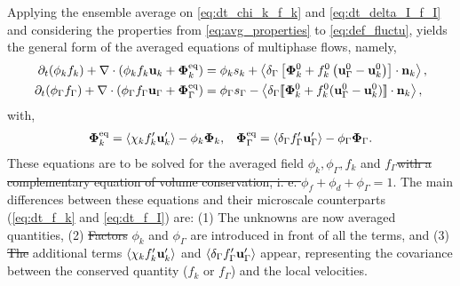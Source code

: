 \documentclass[11pt]{My_preprint}
\providecommand{\DIFadd}[1]{{\protect\color{blue}\uwave{#1}}} %
\providecommand{\DIFdel}[1]{{\protect\color{red}\sout{#1}}}                      %
\providecommand{\DIFaddbegin}{} %
\providecommand{\DIFaddend}{} %
\providecommand{\DIFdelbegin}{} %
\providecommand{\DIFdelend}{} %
\begin{document}
Applying the ensemble average on \ref{eq:dt_chi_k_f_k} and \ref{eq:dt_delta_I_f_I} and considering the properties from \ref{eq:avg_properties} to \ref{eq:def_fluctu}, yields the general form of the averaged equations of multiphase flows, namely,
\begin{align}
    \pddt (\phi_k f_k)
    +\div (\phi_k f_k \textbf{u}_k + \mathbf{\Phi}_k^\text{eq})
    &= 
    \phi_k s_k
    + \avg{\delta_\Gamma\left[
        \mathbf{\Phi}_k^0
        + f_k^0
        \left(
            \textbf{u}_\Gamma^0
            - \textbf{u}_k^0
        \right)
    \right]
    \cdot \textbf{n}_k},
    \label{eq:avg_dt_chi_f}\\
    \pddt (\phi_\Gamma f_\Gamma)
    +\div (\phi_\Gamma f_\Gamma \textbf{u}_\Gamma+ \mathbf{\Phi}_\Gamma^\text{eq})
    &= 
    \phi_\Gamma s_\Gamma
    - \avg{\delta_\Gamma 
    \Jump{
    \mathbf{\Phi}_k^0
    + f_k^0 (\textbf{u}_\Gamma^0 - \textbf{u}_k^0)
    } 
     },
    \label{eq:avg_dt_delta_f}
\end{align}
with, 
\begin{align}
    \mathbf{\Phi}_k^\text{eq}
    = \left<\chi_k f_k' \textbf{u}_k'\right>
    - \phi_k \bm\Phi_k,
    &&
    \mathbf{\Phi}_\Gamma^\text{eq}
    = \left<\delta_\Gamma f_\Gamma' \textbf{u}_\Gamma'\right>
    - \phi_\Gamma \bm\Phi_\Gamma. 
\end{align}
These equations are to be solved for the averaged field \DIFdelbegin \DIFdel{$\phi_k,\phi_\Gamma,f_k$ }\DIFdelend \DIFaddbegin \DIFadd{$f_f,f_d$, }\DIFaddend and $f_\Gamma$\DIFdelbegin \DIFdel{with a complementary equation of volume conservation, i.
e. $\phi_f+\phi_d+\phi_\Gamma = 1$}\DIFdelend .
The main differences between these equations and their microscale counterparts (\ref{eq:dt_f_k} and \ref{eq:dt_f_I}) are:
(1) The unknowns are now averaged quantities,
(2) \DIFdelbegin \DIFdel{Factors }\DIFdelend \DIFaddbegin \DIFadd{factors }\DIFaddend $\phi_k$ and $\phi_\Gamma$ are introduced in front of all the terms, and
(3) \DIFdelbegin \DIFdel{The }\DIFdelend \DIFaddbegin \DIFadd{the }\DIFaddend additional terms $\left<\chi_k f_k' \textbf{u}_k'\right>$ and $\left<\delta_\Gamma f_\Gamma' \textbf{u}_\Gamma'\right>$ appear, representing the covariance between the conserved quantity ($f_k$ or $f_\Gamma$) and the local velocities.  
\end{document}

